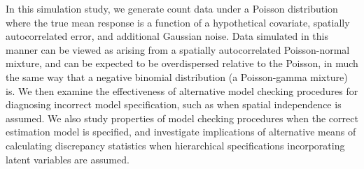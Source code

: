 \documentclass[12pt,english]{article}
\begin{document}
\begin{spacing}{1.9}
In this simulation study, we generate count data under a Poisson distribution where the true mean response is a function of a hypothetical covariate, spatially autocorrelated error, and additional Gaussian noise.  Data simulated in this manner can be viewed as arising from a spatially autocorrelated Poisson-normal mixture, and can be expected to be overdispersed relative to the Poisson, in much the same way that a negative binomial distribution (a Poisson-gamma mixture) is.  We then examine the effectiveness of alternative model checking procedures for diagnosing incorrect model specification, such as when spatial independence is assumed.  We also study properties of model checking procedures when the correct estimation model is specified, and investigate implications of alternative means of calculating discrepancy statistics when hierarchical specifications incorporating latent variables are assumed.


\end{spacing}
\end{document}
